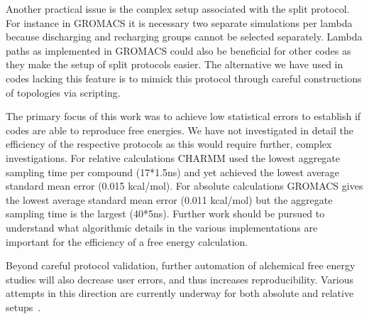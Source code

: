 \documentclass[journal=jctcce,manuscript=article]{achemso}
\begin{document}
 Another practical issue is the complex setup associated with the split protocol. For instance in GROMACS it is necessary  two separate simulations per lambda because discharging and recharging groups cannot be selected separately.
Lambda paths as implemented in GROMACS could also be beneficial for other codes as they make the setup of split protocols easier.  The alternative we have used in codes lacking this feature is to mimick this protocol through careful constructions of
topologies via scripting.
%

The primary focus of this work was to achieve low statistical errors to establish if codes are able to reproduce free energies.  We have not investigated in detail the efficiency of the respective protocols as this would require further, complex investigations. {\color{blue}For relative calculations CHARMM used the lowest aggregate sampling time per compound (17*1.5ns) and yet achieved the lowest average standard mean error (0.015 kcal/mol). For absolute calculations GROMACS gives the lowest average standard mean error (0.011 kcal/mol) but the aggregate sampling time is the largest (40*5ns). Further work should be pursued to understand what algorithmic details in the various implementations are important for the efficiency of a free energy calculation.}



 Beyond careful protocol validation,  further automation of alchemical free energy studies will also decrease user errors, and thus increases  reproducibility.  Various attempts in
this direction are currently underway for both absolute and relative
setups~\cite{christ_accuracy_2013, JCC:JCC23804, Liu2013,
doi:10.1021/jp505332p, doi:10.1021/acs.jcim.6b00162,
doi:10.1021/acs.jctc.6b00979,loeffler_fesetup:_2015}.
\end{document}
